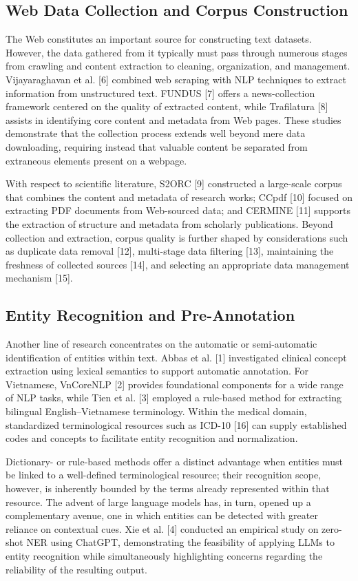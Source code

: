 \documentclass[runningheads]{llncs}
\begin{document}
\subsection{Web Data Collection and Corpus Construction}
The Web constitutes an important source for constructing text datasets. However, the data gathered from it typically must pass through numerous stages from crawling and content extraction to cleaning, organization, and management. Vijayaraghavan et al. [6] combined web scraping with NLP techniques to extract information from unstructured text. FUNDUS [7] offers a news-collection framework centered on the quality of extracted content, while Trafilatura [8] assists in identifying core content and metadata from Web pages. These studies demonstrate that the collection process extends well beyond mere data downloading, requiring instead that valuable content be separated from extraneous elements present on a webpage.

With respect to scientific literature, S2ORC [9] constructed a large-scale corpus that combines the content and metadata of research works; CCpdf [10] focused on extracting PDF documents from Web-sourced data; and CERMINE [11] supports the extraction of structure and metadata from scholarly publications. Beyond collection and extraction, corpus quality is further shaped by considerations such as duplicate data removal [12], multi-stage data filtering [13], maintaining the freshness of collected sources [14], and selecting an appropriate data management mechanism [15].
\subsection{Entity Recognition and Pre-Annotation}
Another line of research concentrates on the automatic or semi-automatic identification of entities within text. Abbas et al. [1] investigated clinical concept extraction using lexical semantics to support automatic annotation. For Vietnamese, VnCoreNLP [2] provides foundational components for a wide range of NLP tasks, while Tien et al. [3] employed a rule-based method for extracting bilingual English--Vietnamese terminology. Within the medical domain, standardized terminological resources such as ICD-10 [16] can supply established codes and concepts to facilitate entity recognition and normalization.

Dictionary- or rule-based methods offer a distinct advantage when entities must be linked to a well-defined terminological resource; their recognition scope, however, is inherently bounded by the terms already represented within that resource. The advent of large language models has, in turn, opened up a complementary avenue, one in which entities can be detected with greater reliance on contextual cues. Xie et al. [4] conducted an empirical study on zero-shot NER using ChatGPT, demonstrating the feasibility of applying LLMs to entity recognition while simultaneously highlighting concerns regarding the reliability of the resulting output.
\end{document}
